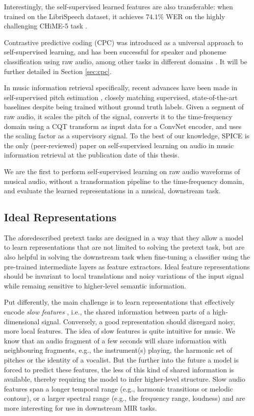 Interestingly, the self-supervised learned features are also transferable: when trained on the LibriSpeech dataset, it achieves $74.1\%$ WER on the highly challenging CHiME-5 task \cite{barker2018fifth}.

Contrastive predictive coding (CPC) was introduced as a universal approach to self-supervised learning, and has been successful for speaker and phoneme classification using raw audio, among other tasks in different domains \cite{oord_representation_2019}.
It will be further detailed in Section \ref{sec:cpc}.

In music information retrieval specifically, recent advances have been made in self-supervised pitch estimation \cite{spice}, closely matching supervised, state-of-the-art baselines despite being trained without ground truth labels.
Given a segment of raw audio, it scales the pitch of the signal, converts it to the time-frequency domain using a CQT transform as input data for a ConvNet encoder, and uses the scaling factor as a supervisory signal.
To the best of our knowledge, SPICE \cite{spice} is the only (peer-reviewed) paper on self-supervised learning on audio in music information retrieval at the publication date of this thesis.

We are the first to perform self-supervised learning on raw audio waveforms of musical audio, without a transformation pipeline to the time-frequency domain, and evaluate the learned representations in a musical, downstream task.

\subsection{Ideal Representations}
The aforedescribed pretext tasks are designed in a way that they allow a model to learn representations that are not limited to solving the pretext task, but are also helpful in solving the downstream task when fine-tuning a classifier using the pre-trained intermediate layers as feature extractors.
Ideal feature representations should be invariant to local translations and noisy variations of the input signal while remaing sensitive to higher-level semantic information.

Put differently, the main challenge is to learn representations that effectively encode \textit{slow features} \cite{wiskott_slow_2002}, i.e., the shared information between parts of a high-dimensional signal.
Conversely, a good representation should disregard noisy, more local features.
The idea of slow features is quite intuitive for music.
We know that an audio fragment of a few seconds will share information with neighbouring fragments, e.g., the instrument(s) playing, the harmonic set of pitches or the identity of a vocalist.
 But the further into the future a model is forced to predict these features, the less of this kind of shared information is available, thereby requiring the model to infer higher-level structure.
Slow audio features span a longer temporal range (e.g., harmonic transitions or melodic contour), or a larger spectral range (e.g., the frequency range, loudness) and are more interesting for use in downstream MIR tasks.


